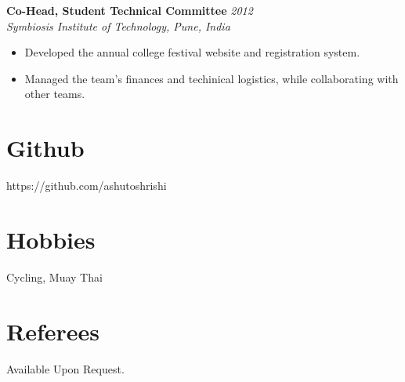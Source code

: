 \documentclass[overlapped]{res}
\begin{document}
\begin{resume}
  \textbf{Co-Head, Student Technical Committee}   \hfill \textit{2012} \\
  \textit{Symbiosis Institute of Technology, Pune, India}
  \begin{itemize}
  \item Developed the annual college festival website and registration system.
  \item Managed the team's finances and techinical logistics, while collaborating 
    with other teams.
  \end{itemize}

  \section{Github} 
  https://github.com/ashutoshrishi 
  \section{Hobbies}
  Cycling, Muay Thai
  
  \section{Referees}
  Available Upon Request.
  
  
\end{resume}
\end{document}
